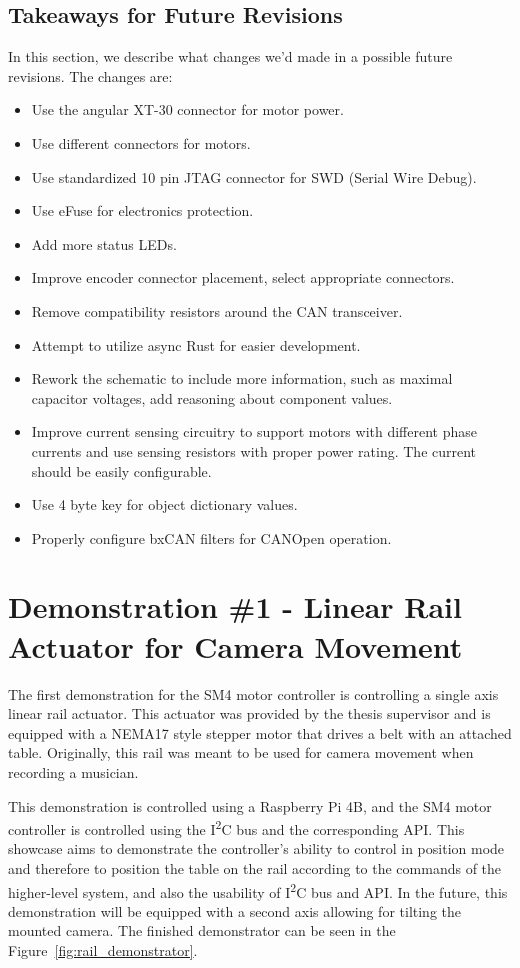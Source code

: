 \subsection{Takeaways for Future Revisions}
\label{subsec:final_takeaways}
In this section, we describe what changes we'd made in a possible future revisions.
The changes are:
\begin{itemize}
    \item Use the angular XT-30 connector for motor power.
    \item Use different connectors for motors.
    \item Use standardized 10 pin JTAG connector for SWD (Serial Wire Debug).
    \item Use eFuse for electronics protection.
    \item Add more status LEDs.
    \item Improve encoder connector placement, select appropriate connectors.
    \item Remove compatibility resistors around the CAN transceiver.
    \item Attempt to utilize async Rust for easier development.
    \item Rework the schematic to include more information, such as maximal capacitor voltages, add reasoning about component values.
    \item Improve current sensing circuitry to support motors with different phase currents and use sensing resistors with proper power rating. The current should be easily configurable.
    \item Use 4 byte key for object dictionary values.
    \item Properly configure bxCAN filters for CANOpen operation.
\end{itemize}

\section{Demonstration \#1 - Linear Rail Actuator for Camera Movement}
\label{sec:dem2}
The first demonstration for the SM4 motor controller is controlling a single axis linear rail actuator.
This actuator was provided by the thesis supervisor and is equipped with a NEMA17 style stepper motor that drives a belt with an attached table.
Originally, this rail was meant to be used for camera movement when recording a musician.

This demonstration is controlled using a Raspberry Pi 4B, and the SM4 motor controller is controlled using the I\textsuperscript{2}C bus and the corresponding API.
This showcase aims to demonstrate the controller's ability to control in position mode and therefore to position the table on the rail according to the commands of the higher-level system, and also the usability of I\textsuperscript{2}C bus and API.
In the future, this demonstration will be equipped with a second axis allowing for tilting the mounted camera.
The finished demonstrator can be seen in the Figure~\ref{fig:rail_demonstrator}.

